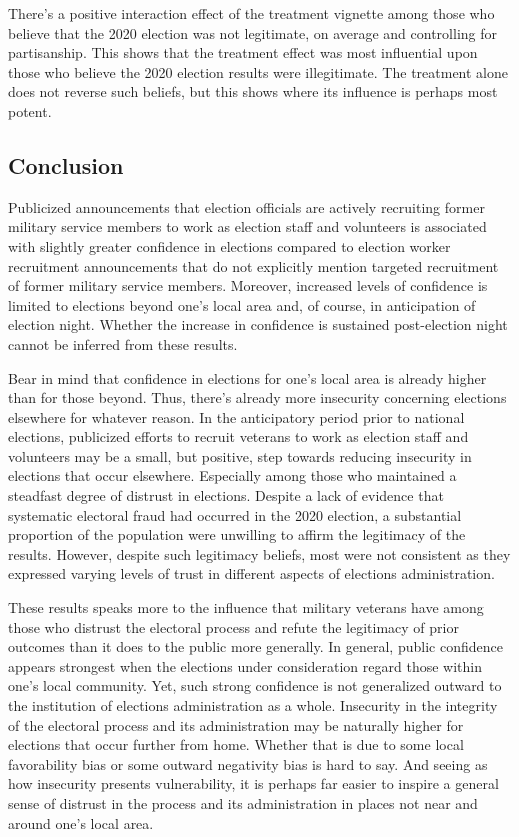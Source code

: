 \documentclass[
  12pt,
  letterpaper,
]{article}
\begin{document}
There's a positive interaction effect of the treatment vignette among
those who believe that the 2020 election was not legitimate, on average
and controlling for partisanship. This shows that the treatment effect
was most influential upon those who believe the 2020 election results
were illegitimate. The treatment alone does not reverse such beliefs,
but this shows where its influence is perhaps most potent.

\subsection{Conclusion}\label{conclusion}

Publicized announcements that election officials are actively recruiting
former military service members to work as election staff and volunteers
is associated with slightly greater confidence in elections compared to
election worker recruitment announcements that do not explicitly mention
targeted recruitment of former military service members. Moreover,
increased levels of confidence is limited to elections beyond one's
local area and, of course, in anticipation of election night. Whether
the increase in confidence is sustained post-election night cannot be
inferred from these results.

Bear in mind that confidence in elections for one's local area is
already higher than for those beyond. Thus, there's already more
insecurity concerning elections elsewhere for whatever reason. In the
anticipatory period prior to national elections, publicized efforts to
recruit veterans to work as election staff and volunteers may be a
small, but positive, step towards reducing insecurity in elections that
occur elsewhere. Especially among those who maintained a steadfast
degree of distrust in elections. Despite a lack of evidence that
systematic electoral fraud had occurred in the 2020 election, a
substantial proportion of the population were unwilling to affirm the
legitimacy of the results. However, despite such legitimacy beliefs,
most were not consistent as they expressed varying levels of trust in
different aspects of elections administration.

These results speaks more to the influence that military veterans have
among those who distrust the electoral process and refute the legitimacy
of prior outcomes than it does to the public more generally. In general,
public confidence appears strongest when the elections under
consideration regard those within one's local community. Yet, such
strong confidence is not generalized outward to the institution of
elections administration as a whole. Insecurity in the integrity of the
electoral process and its administration may be naturally higher for
elections that occur further from home. Whether that is due to some
local favorability bias or some outward negativity bias is hard to say.
And seeing as how insecurity presents vulnerability, it is perhaps far
easier to inspire a general sense of distrust in the process and its
administration in places not near and around one's local area.
\end{document}
